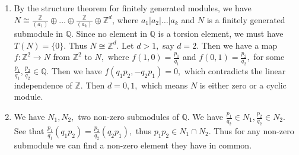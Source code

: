 \documentclass{article}
\begin{document}
\section{} %
\begin{enumerate}
	\item By the structure theorem for finitely generated modules, we have $N \cong \frac{\mathbb{Z}}{(a_1)}\oplus \dots \oplus 
	\frac{\mathbb{Z}}{(a_k)}\oplus \mathbb{Z}^d$, where $a_1|a_2|\dots|a_k$ and $N$ is a finitely generated submodule in $\mathbb{Q}.$ Since no element in 
	$\mathbb{Q}$ is a torsion element, we must have $T(N)=\{0\}.$ Thus $N \cong \mathbb{Z}^d.$ Let $d >1,$ say $d=2.$ Then we have a map $f: \mathbb{Z}^2 
	\rightarrow N$ from $\mathbb{Z}^2$ to $N,$ where $f(1,0)=\frac{p_1}{q_1}$ and $f(0,1)=\frac{p_2}{q_2},$ for some $\frac{p_1}{q_1},\frac{p_2}{q_2} \in 
	\mathbb{Q}.$ Then we have $ f(q_1p_2,-q_2p_1)=0, $ which contradicts the linear independence of $\mathbb{Z}.$ Then $d=0,1,$ which means $N$ is either 
	zero or a cyclic module.
	
	\item We have $N_1,N_2,$ two non-zero submodules of $\mathbb{Q}.$ We have $\frac{p_1}{q_2} \in N_1, \frac{p_2}{q_2} \in N_2.$ See that $ 
	\frac{p_1}{q_1}(q_1p_2)=\frac{p_2}{q_2}(q_2p_1),$ thus $p_1p_2 \in N_1 \cap N_2.$ Thus for any non-zero submodule we can find a non-zero element they 
	have in common. 
	

\end{enumerate}
\end{document}
